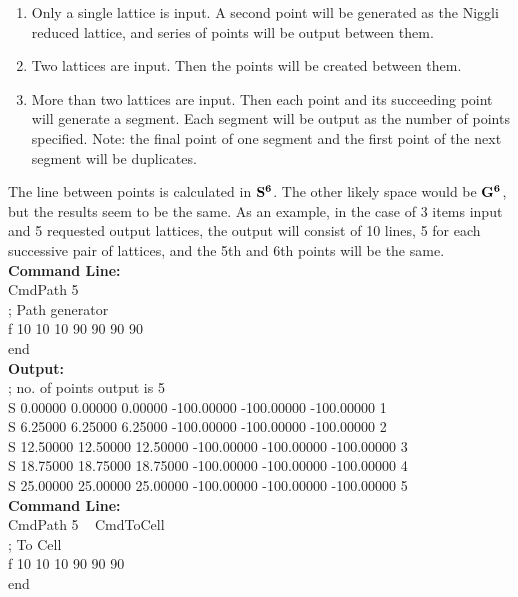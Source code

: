 \documentclass[preprint]{iucr}              %
\numberwithin{equation}{section}
\newcommand{\SVI}[0]{$\bf{S^{6}}$}
\newcommand{\GVI}[0]{$\bf{G^{6}}$}
\begin{document}
\begin{itemize}
\begin{enumerate}
	\item Only a single lattice is input. A second point will
	be generated as the Niggli reduced lattice, and series of points
	will be output between them.
	
	\item Two lattices are input. Then the points will be
	created between them.
	
	\item More than two lattices are input. Then each point
	and its succeeding point will generate a segment. Each segment
	will be output as the number of points specified. Note: the
	final point of one segment and the first point of the next
	segment will be duplicates.
\end{enumerate}
	
	The line between points is calculated in \SVI{}. The other
	likely space would be \GVI{}, but the results seem to be the same.
	As an example, in the case of 3 items input and 5 requested
	output lattices, the output will consist of 10 lines, 5
	for each successive pair of lattices, and the 5th and
	6th points will be the same.\\
	
	\textbf{Command Line:}\\
	 CmdPath 5 \\
	; Path generator\\
	f 10 10 10 90 90 90 90\\
	end\\
	
	\textbf{Output:}\\
	; no. of points output is 5\\
	S    0.00000   0.00000   0.00000 -100.00000 -100.00000 -100.00000    1\\
	S    6.25000   6.25000   6.25000 -100.00000 -100.00000 -100.00000    2\\
	S   12.50000  12.50000  12.50000 -100.00000 -100.00000 -100.00000    3\\
	S   18.75000  18.75000  18.75000 -100.00000 -100.00000 -100.00000    4\\
	S   25.00000  25.00000  25.00000 -100.00000 -100.00000 -100.00000    5\\
	
	\textbf{Command Line:}\\
	 CmdPath 5  \textbar~ CmdToCell\\
	; To Cell\\
	f 10 10 10  90 90 90\\
	end\\
	

\end{itemize}
\end{document}
